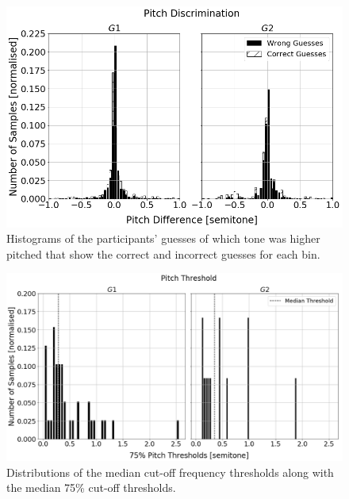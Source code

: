 \documentclass[]{interact}
\begin{document}
\begin{figure}
  \centering
  \includegraphics[width=1.0\textwidth]{figures/pitch_discrimination.png}
  \caption{Histograms of the participants' guesses of which tone was higher pitched that show the correct and incorrect guesses for each bin. }\label{fig:pitch-discrimination}
\end{figure}

\begin{figure}
  \centering
  \includegraphics[width=1.0\textwidth]{figures/pitch_thresholds.png}
  \caption{Distributions of the median cut-off frequency thresholds along with the median 75\% cut-off thresholds. }\label{fig:pitch-thresholds}
\end{figure}
\end{document}
